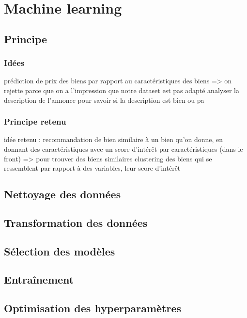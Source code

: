 \documentclass[a4paper, 12pt, twoside]{report}
\begin{document}
\chapter{Machine learning}

\section{Principe}

\subsection{Idées}

prédiction de prix des biens par rapport au caractéristiques des biens => on rejette parce que on a l’impression que notre dataset est pas adapté
analyser la description de l’annonce pour savoir si la description est bien ou pa

\subsection{Principe retenu}

idée retenu : recommandation de bien similaire à un bien qu’on donne, en donnant des caractéristiques avec un score d’intérêt  par caractéristiques (dans le front) => pour trouver des biens similaires
clustering des biens qui se ressemblent par rapport à des variables, leur score d’intérêt 

\section{Nettoyage des données}

\section{Transformation des données}

\section{Sélection des modèles}

\section{Entraînement}

\section{Optimisation des hyperparamètres}
\end{document}
